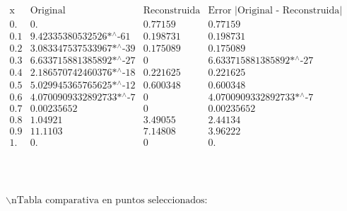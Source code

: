 \documentclass{article}
\begin{document}
\noindent\(\begin{array}{cccc}
 \text{x} & \text{Original} & \text{Reconstruida} & \text{Error $|$Original - Reconstruida$|$} \\
 0. & 0. & 0.77159 & 0.77159 \\
 0.1 & \text{9.42335380532526$\grave{ }$*${}^{\wedge}$-61} & 0.198731 & 0.198731 \\
 0.2 & \text{3.083347537533967$\grave{ }$*${}^{\wedge}$-39} & 0.175089 & 0.175089 \\
 0.3 & \text{6.633715881385892$\grave{ }$*${}^{\wedge}$-27} & 0 & \text{6.633715881385892$\grave{ }$*${}^{\wedge}$-27} \\
 0.4 & \text{2.186570742460376$\grave{ }$*${}^{\wedge}$-18} & 0.221625 & 0.221625 \\
 0.5 & \text{5.029945365765625$\grave{ }$*${}^{\wedge}$-12} & 0.600348 & 0.600348 \\
 0.6 & \text{4.0700909332892733$\grave{ }$*${}^{\wedge}$-7} & 0 & \text{4.0700909332892733$\grave{ }$*${}^{\wedge}$-7} \\
 0.7 & 0.00235652 & 0 & 0.00235652 \\
 0.8 & 1.04921 & 3.49055 & 2.44134 \\
 0.9 & 11.1103 & 7.14808 & 3.96222 \\
 1. & 0. & 0 & 0. \\
\end{array}\)

\noindent\(\begin{array}{cc}
 
\begin{array}{cc}
  &  \\
\end{array}
 &  \\
\end{array}\)

\noindent\(\text{$\backslash $nTabla comparativa en puntos seleccionados:}\)
\end{document}
